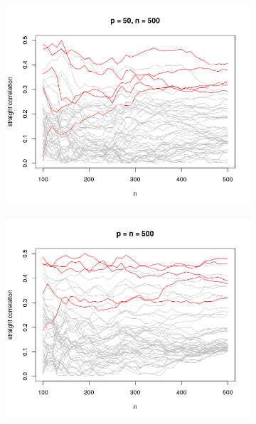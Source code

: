 \documentclass[11pt]{report}\usepackage[utf8]{inputenc}
\begin{document}
\begin{landscape}

\begin{figure}
    \centering
    \begin{subfigure}[b]{0.45\textwidth}
        \includegraphics[width=\textwidth]{../plots/low-dim cor}
        \caption{}
    \end{subfigure}
    \begin{subfigure}[b]{0.45\textwidth}
        \includegraphics[width=\textwidth]{../plots/med-dim cor}
        \caption{}
    \end{subfigure}

\end{figure}
\end{landscape}
\end{document}
